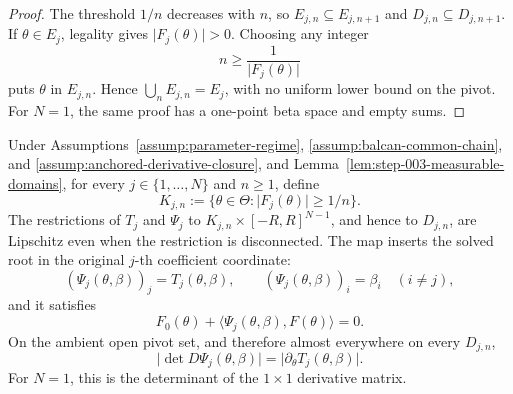 \begin{proof}
The threshold \(1/n\) decreases with \(n\), so \(E_{j,n}\subseteq E_{j,n+1}\) and
\(D_{j,n}\subseteq D_{j,n+1}\). If \(\theta\in E_j\), legality gives
\(\lvert F_j(\theta)\rvert>0\). Choosing any integer
\begin{equation}
\label{eq:appendix-display-067}
n\geq\frac{1}{\lvert F_j(\theta)\rvert}
\end{equation}
puts \(\theta\) in \(E_{j,n}\). Hence \(\bigcup_nE_{j,n}=E_j\), with no uniform lower bound on the pivot.
For \(N=1\), the same proof has a one-point beta space and empty sums. 
\end{proof}

\begin{lemma}
\label{lem:step-003-finite-chart}

Under Assumptions~\ref{assump:parameter-regime}, \ref{assump:balcan-common-chain}, and
\ref{assump:anchored-derivative-closure}, and Lemma~\ref{lem:step-003-measurable-domains}, for every
\(j\in\{1,\ldots,N\}\) and \(n\geq1\), define
\begin{equation}
\label{eq:appendix-display-068}
K_{j,n}:=\{\theta\in\Theta:\lvert F_j(\theta)\rvert\geq1/n\}.
\end{equation}
The restrictions of \(T_j\) and \(\Psi_j\) to
\(K_{j,n}\times[-R,R]^{N-1}\), and hence to \(D_{j,n}\), are Lipschitz even when the restriction is
disconnected. The map inserts the solved root in the original \(j\)-th coefficient coordinate:
\begin{equation}
\label{eq:appendix-display-069}
(\Psi_j(\theta,\beta))_j=T_j(\theta,\beta),
\qquad
(\Psi_j(\theta,\beta))_i=\beta_i\quad(i\neq j),
\end{equation}
and it satisfies
\begin{equation}
\label{eq:appendix-display-070}
F_0(\theta)+\langle\Psi_j(\theta,\beta),F(\theta)\rangle=0.
\end{equation}
On the ambient open pivot set, and therefore almost everywhere on every \(D_{j,n}\),
\begin{equation}
\label{eq:appendix-display-071}
\lvert\det D\Psi_j(\theta,\beta)\rvert
=\lvert\partial_\theta T_j(\theta,\beta)\rvert.
\end{equation}
For \(N=1\), this is the determinant of the \(1\times1\) derivative matrix.


\end{lemma}

